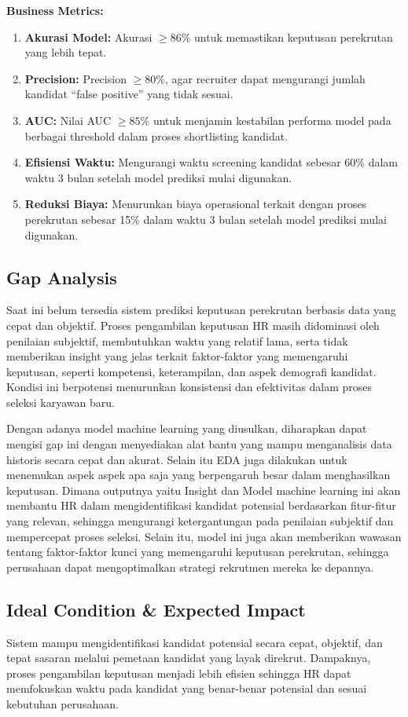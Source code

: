 \textbf{Business Metrics:}
\begin{enumerate}
    \item \textbf{Akurasi Model:} Akurasi $\geq 86\%$ untuk memastikan keputusan perekrutan yang lebih tepat.
    \item \textbf{Precision:} Precision $\geq 80\%$, agar recruiter dapat mengurangi jumlah kandidat “false positive” yang tidak sesuai.
    \item \textbf{AUC:} Nilai AUC $\geq 85\%$ untuk menjamin kestabilan performa model pada berbagai threshold dalam proses shortlisting kandidat.
    \item \textbf{Efisiensi Waktu:} Mengurangi waktu screening kandidat sebesar 60\% dalam waktu 3 bulan setelah model prediksi mulai digunakan.
    \item \textbf{Reduksi Biaya:} Menurunkan biaya operasional terkait dengan proses perekrutan sebesar 15\% dalam waktu 3 bulan setelah model prediksi mulai digunakan.
\end{enumerate}

\subsection{Gap Analysis}
Saat ini belum tersedia sistem prediksi keputusan perekrutan berbasis data yang cepat dan objektif. Proses pengambilan keputusan HR masih didominasi oleh penilaian subjektif, membutuhkan waktu yang relatif lama, serta tidak memberikan insight yang jelas terkait faktor-faktor yang memengaruhi keputusan, seperti kompetensi, keterampilan, dan aspek demografi kandidat. Kondisi ini berpotensi menurunkan konsistensi dan efektivitas dalam proses seleksi karyawan baru.

Dengan adanya model machine learning yang diusulkan, diharapkan dapat mengisi gap ini dengan menyediakan alat bantu yang mampu menganalisis data historis secara cepat dan akurat. Selain itu EDA juga dilakukan untuk menemukan aspek aspek apa saja yang berpengaruh besar dalam menghasilkan keputusan. Dimana outputnya yaitu Insight dan Model machine learning ini akan membantu HR dalam mengidentifikasi kandidat potensial berdasarkan fitur-fitur yang relevan, sehingga mengurangi ketergantungan pada penilaian subjektif dan mempercepat proses seleksi. Selain itu, model ini juga akan memberikan wawasan tentang faktor-faktor kunci yang memengaruhi keputusan perekrutan, sehingga perusahaan dapat mengoptimalkan strategi rekrutmen mereka ke depannya.

\subsection{Ideal Condition \& Expected Impact}
Sistem mampu mengidentifikasi kandidat potensial secara cepat, objektif, dan tepat sasaran melalui pemetaan kandidat yang layak direkrut. Dampaknya, proses pengambilan keputusan menjadi lebih efisien sehingga HR dapat memfokuskan waktu pada kandidat yang benar-benar potensial dan sesuai kebutuhan perusahaan.




